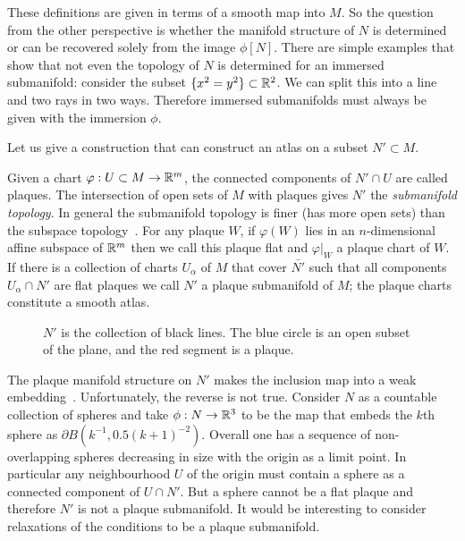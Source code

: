 These definitions are given in terms of a smooth map into $M$.
So the question from the other perspective is whether the manifold structure of $N$ is determined or can be recovered solely from the image $\phi[N]$.
There are simple examples that show that not even the topology of $N$ is determined for an immersed submanifold: consider the subset $\{x^2 = y^2\} \subset \mathbb{R}^2$.
We can split this into a line and two rays in two ways.
Therefore immersed submanifolds must always be given with the immersion $\phi$.

Let us give a construction that can construct an atlas on a subset $N' \subset M$.

\begin{definition}\textup{\cite[Def~1.2.1,1.2.2,Thm~1.2.7]{Sharpe1997}}
Given a chart $\varphi: U \subset M \to \mathbb{R}^m$, the connected components of $N'\cap U$ are called plaques.
The intersection of open sets of $M$ with plaques gives $N'$ the \emph{submanifold topology}.
In general the submanifold topology is finer (has more open sets) than the subspace topology~\cite[Def~1.2.4]{Sharpe1997}.
For any plaque $W$, if $\varphi(W)$ lies in an $n$-dimensional affine subspace of $\mathbb{R}^m$ then we call this plaque flat and $\varphi|_W$ a plaque chart of $W$.
If there is a collection of charts $U_\alpha$ of $M$ that cover $\bar{N'}$ such that all components $U_\alpha\cap N'$ are flat plaques
we call $N'$ a plaque submanifold of $M$; the plaque charts constitute a smooth atlas.
\end{definition}

\begin{figure}[h]
\begin{center}
\caption{$N'$ is the collection of black lines. The blue circle is an open subset of the plane, and the red segment is a plaque.}
\end{center}
\end{figure}

The plaque manifold structure on $N'$ makes the inclusion map into a weak embedding~\cite[Thm~1.2.7]{Sharpe1997}.
Unfortunately, the reverse is not true.
Consider $N$ as a countable collection of spheres and take $\phi : N \to \mathbb{R}^3$ to be the map that embeds the $k$th sphere as $\partial B(k^{-1}, 0.5(k+1)^{-2})$.
Overall one has a sequence of non-overlapping spheres decreasing in size with the origin as a limit point.
In particular any neighbourhood $U$ of the origin must contain a sphere as a connected component of $U \cap N'$.
But a sphere cannot be a flat plaque and therefore $N'$ is not a plaque submanifold.
It would be interesting to consider relaxations of the conditions to be a plaque submanifold.

